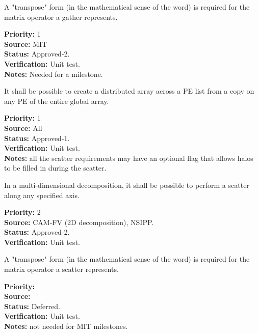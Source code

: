 A "transpose" form (in the mathematical sense of the word) is required
for the matrix operator a gather represents.
\begin{reqlist}
{\bf Priority:} 1 \\ 
{\bf Source:}  MIT \\
{\bf Status:} Approved-2. \\
{\bf Verification:} Unit test. \\
{\bf Notes:} Needed for a milestone.
\end{reqlist}


It shall be possible to create a distributed array across a PE list
from a copy on any PE of the entire global array.

\begin{reqlist}
{\bf Priority:} 1 \\ 
{\bf Source:} All\\
{\bf Status:} Approved-1. \\
{\bf Verification:} Unit test. \\
{\bf Notes:} all the scatter requirements may have an optional flag
that allows halos to be filled in during the scatter.
\end{reqlist}


In a multi-dimensional decomposition, it shall be possible to perform
a scatter along any specified axis.

\begin{reqlist}
{\bf Priority:} 2 \\ 
{\bf Source:} CAM-FV (2D decomposition), NSIPP. \\
{\bf Status:} Approved-2. \\
{\bf Verification:} Unit test. 
\end{reqlist}

A "transpose" form (in the mathematical sense of the word) is required
for the matrix operator a scatter represents.
\begin{reqlist}
{\bf Priority:} \\ 
{\bf Source:} \\
{\bf Status:} Deferred. \\
{\bf Verification:} Unit test. \\
{\bf Notes:} not needed for MIT milestones.
\end{reqlist}


